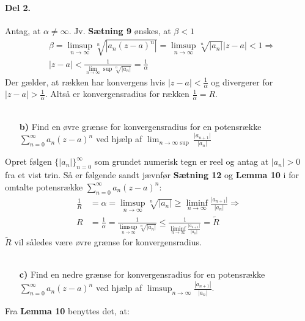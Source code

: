 \documentclass[12pt]{article}
\begin{document}
\paragraph{Del 2.} Antag, at $\alpha \neq \infty$. Jv. \textbf{Sætning 9} ønskes, at $\beta<1$
\begin{align}
&\beta =  \limsup_{n \rightarrow \infty} \sqrt[n]{|a_{n}(z-a)^n|} = \limsup_{n \rightarrow \infty} \sqrt[n]{|a_n |}|z-a|<1 \nonumber \Rightarrow \\
&|z-a| < \frac{1}{ \lim_{n \rightarrow \infty} \sup \sqrt[n]{|a_n |}} = \frac{1}{ \alpha }
\end{align}
Der gælder, at rækken har konvergens hvis $|z-a| < \frac{1}{\alpha}$ og divergerer for $|z-a| > \frac{1}{\alpha}$. Altså er konvergensradius for rækken $\frac{1}{\alpha}=R$.\\\\
\begin{itemize}
\item[\textbf{b)}] Find en øvre grænse for konvergensradius for en potensrække $\sum_{n = 0}^{\infty} a_n(z-a)^n$ ved hjælp af $\lim_{n \rightarrow \infty \sup} \frac{\vert a_{n+1} \vert}{\vert a_n \vert} $
\end{itemize}
Opret følgen $\lbrace \vert a_n \vert\rbrace _{n=0}^{\infty}$ som grundet numerisk tegn er reel og antag at $|a_n| > 0$ fra et vist trin. Så er følgende sandt jævnfør \textbf{Sætning 12} og \textbf{Lemma 10} i for omtalte potensrække  $\sum_{n = 0}^{\infty} a_n(z-a)^n$:
\begin{align} \label{buhu} 
\frac{1}{R} &= \alpha = \limsup_{n \rightarrow \infty} \sqrt[n]{\vert a_n \vert} \geq \liminf_{n \rightarrow \infty} \frac{\vert a_{n+1} \vert}{\vert a_n \vert} \nonumber \Rightarrow \\
R &= \frac{1}{\alpha} = \frac{1}{\limsup_{n \rightarrow \infty} \sqrt[n]{\vert a_n \vert}} \leq \frac{1}{\liminf_{n \rightarrow \infty} \frac{\vert a_{n+1} \vert}{\vert a_n \vert}} = \widetilde{R}
\end{align}
$\widetilde{R}$ vil således være øvre grænse for konvergensradius.\\\\
\begin{itemize}
\item[\textbf{c)}] Find en nedre grænse for konvergensradius for en potensrække\\
$\sum_{n=0}^{\infty}a_n(z-a)^n$ ved hjælp af $\limsup_{n \rightarrow \infty} \frac{|a_{n+1}|}{|a_n|}$.
\end{itemize}
Fra \textbf{Lemma 10} benyttes det, at:
\end{document}

